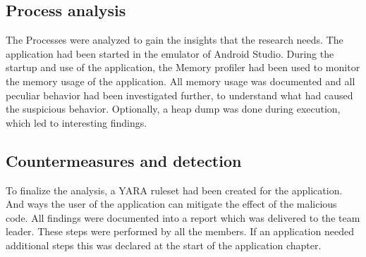 \subsection{Process analysis}
The Processes were analyzed to gain the insights that the research needs.
The application had been started in the emulator of Android Studio.
During the startup and use of the application, the Memory profiler had been used to monitor the memory usage of the application.
All memory usage was documented and all peculiar behavior had been investigated further, to understand what had caused the suspicious behavior.
Optionally, a heap dump was done during execution, which led to interesting findings.

\subsection{Countermeasures and detection}

To finalize the analysis, a YARA ruleset had been created for the application.
And ways the user of the application can mitigate the effect of the malicious code. 
All findings were documented into a report which was delivered to the team leader.
These steps were performed by all the members.
If an application needed additional steps this was declared at the start of the application chapter.